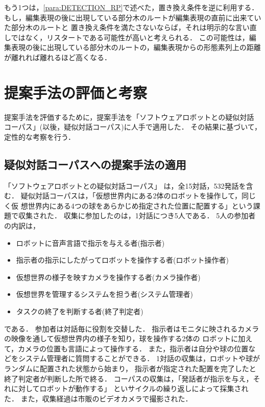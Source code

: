 もう1つは，\ref{para:DETECTION_RP}で述べた，置き換え条件を逆に利用する．
もし，編集表現の後に出現している部分木のルートが編集表現の直前に出来ていた部分木のルートと
置き換え条件を満たさないならば，それは明示的な言い直しではなく，リスタートである可能性が高いと考えられる．
この可能性は，編集表現の後に出現している部分木のルートの，編集表現からの形態素列上の距離が離れれば離れるほど高くなる．


\section{提案手法の評価と考察}\label{sec:EVAL}
提案手法を評価するために，提案手法を「ソフトウェアロボットとの疑似対話
コーパス\cite{QDC}」(以後，疑似対話コーパス)に人手で適用した．
その結果に基づいて，定性的な考察を行う．

\subsection{疑似対話コーパスへの提案手法の適用}
「ソフトウェアロボットとの疑似対話コーパス」
は，全15対話，532発話を含む．
疑似対話コーパスは，「仮想世界内にある2体のロボットを操作して，同じく仮
想世界内にある4つの球をあらかじめ指定された位置に配置する」という課
題で収集された．
収集に参加したのは，1対話につき5人である．
5人の参加者の内訳は，
\begin{itemize}
\item ロボットに音声言語で指示を与える者(指示者)
\item 指示者の指示にしたがってロボットを操作する者(ロボット操作者)
\item 仮想世界の様子を映すカメラを操作する者(カメラ操作者)
\item 仮想世界を管理するシステムを担う者(システム管理者)
\item タスクの終了を判断する者(終了判定者)
\end{itemize}
である．
参加者は対話毎に役割を交替した．
指示者はモニタに映されるカメラの映像を通して仮想世界内の様子を知り，球を操作する2体の
ロボットに加えて，カメラの位置も言語によって操作する．
また，指示者は自分や球の位置などをシステム管理者に質問することができる．
1対話の収集は，ロボットや球がランダムに配置された状態から始まり，
指示者が指定された配置を完了したと終了判定者が判断した所で終る．
コーパスの収集は，「発話者が指示を与え，それに対してロボットが動作する」
といサイクルの繰り返しによって採集された．
また，収集経過は市販のビデオカメラで撮影された．


